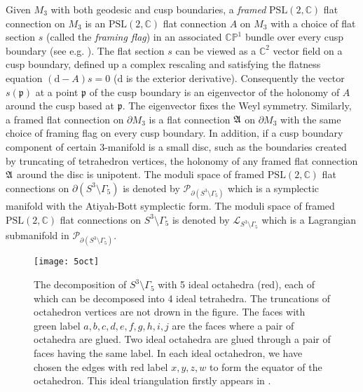 \documentclass[aps,prd,notitlepage,nofootinbib,superscriptaddress,groupedaddress,twocolumn]{revtex4-1}
\def\C{\mathbb{C}}
\newcommand{\PSlc}{\mathrm{PSL}(2,\mathbb{C})}
\newcommand{\cl}{\mathcal L}
\newcommand{\calp}{\mathcal P}
\newcommand{\fp}{\mathfrak{p}}  \newcommand{\Fp}{\mathfrak{P}}
\newcommand{\G}{\Gamma}
\newcommand{\rmd}{\mathrm d}
\begin{document}
Given $M_3$ with both geodesic and cusp boundaries, a \emph{framed} $\PSlc$ flat connection on $M_3$ is an $\PSlc$ flat connection $A$ on $M_3$ with a choice of flat section $s$ (called the \emph{framing flag}) in an associated $\mathbb{CP}^1$ bundle over every cusp boundary (see e.g. \cite{DGV,GMN09,FG03}). The flat section $s$ can be viewed as a $\C^2$ vector field on a cusp boundary, defined up a complex rescaling and satisfying the flatness equation $(\rmd-A)s=0$ ($\rmd$ is the exterior derivative). Consequently the vector $s(\fp)$ at a point $\fp$ of the cusp boundary is an eigenvector of the holonomy of $A$ around the cusp based at $\fp$. The eigenvector fixes the Weyl symmetry. Similarly, a framed flat connection on $\partial M_3$ is a flat connection $\mathfrak{A}$ on $\partial M_3$ with the same choice of {framing flag} on every cusp boundary. In addition, if a cusp boundary component of certain 3-manifold is a small disc, such as the boundaries created by truncating of tetrahedron vertices, the holonomy of any framed flat connection $\mathfrak{A}$ around the disc is unipotent. The moduli space of framed $\PSlc$ flat connections on $\partial (S^3\setminus\G_5)$ is denoted by $\calp_{\partial (S^3\setminus\G_5)}$ which is a symplectic manifold with the Atiyah-Bott symplectic form. The moduli space of framed $\PSlc$ flat connections on $S^3\setminus\G_5$ is denoted by $\cl_{S^3\setminus\G_5}$ which is a Lagrangian submanifold in $\calp_{\partial (S^3\setminus\G_5)}$.  


\begin{widetext}

	\begin{figure}[H]
		\begin{center}
		\texttt{[image: 5oct]}
		\caption{The decomposition of $S^3\setminus\G_5$ with 5 ideal octahedra (red), each of which can be decomposed into 4 ideal tetrahedra. The truncations of octahedron vertices are not drown in the figure. The faces with green label $a,b,c,d,e,f,g,h,i,j$ are the faces where a pair of octahedra are glued. Two ideal octahedra are glued through a pair of faces having the same label. In each ideal octahedron, we have chosen the edges with red label $x,y,z,w$ to form the equator of the octahedron. This ideal triangulation firstly appears in \cite{hanSUSY}.}
		\label{5oct}
		\end{center}
		\end{figure}
		
\end{widetext}
\end{document}
